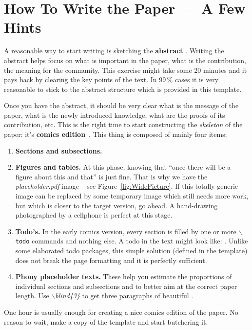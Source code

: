 \section{How To Write the Paper --- A Few Hints}
\label{sec:HowToWrite}

A reasonable way to start writing is sketching the \textbf{abstract} \cite{Herout-Abstract}.  Writing the abstract helps focus on what is important in the paper, what is the contribution, the meaning for the community.  This exercise might take some 20 minutes and it pays back by clearing the key points of the text.  
In 99\,\% cases it is very reasonable to stick to the abstract structure \cite{Lebrun2011} which is provided in this template.

Once you have the abstract, it should be very clear what is the message of the paper, what is the newly introduced knowledge, what are the proofs of its contribution, etc.  This is the right time to start constructing the \emph{skeleton} of the paper: it's \textbf{comics edition}~\cite{Herout-Comics}.
This thing is composed of mainly four items:
\begin{enumerate} [noitemsep]
	\item \textbf{Sections and subsections.}
	\item \textbf{Figures and tables.}  At this phase, knowing that ``once there will be a figure about this and that'' is just fine.  That is why we have the \textit{placeholder.pdf} image -- see Figure~\ref{fig:WidePicture}.  If this totally generic image can be replaced by some temporary image which still needs more work, but which is closer to the target version, go ahead. A hand-drawing photographed by a cellphone is perfect at this stage.
	\item \textbf{Todo's.} In the early comics version, every section is filled by one or more \texttt{$\backslash$todo} commands and nothing else.  A todo in the text might look like: .  Unlike some elaborated todo packages, this simple solution (defined in the template) does not break the page formatting and it is perfectly sufficient.
	\item \textbf{Phony placeholder texts.}  These help you estimate the proportions of individual sections and subsections and to better aim at the correct paper length. Use \textit{$\backslash$blind\{3\}} to get three paragraphs of beautiful .
\end{enumerate}
One hour is usually enough for creating a nice comics edition of the paper.  No reason to wait, make a copy of the template and start butchering it. 

